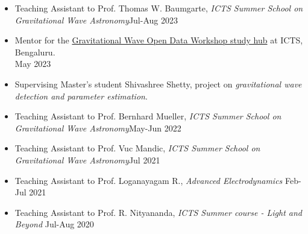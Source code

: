 \begin{itemize}[noitemsep]
\item Teaching Assistant to Prof. Thomas W. Baumgarte, \textit{ICTS Summer School on Gravitational Wave Astronomy}\hfill{Jul-Aug 2023}
\item Mentor for the \href{https://www.icts.res.in/discussion-meeting/gwodw2023}{Gravitational Wave Open Data Workshop study hub} at ICTS, Bengaluru.\\ \hfill{May 2023}
\item Supervising Master's student Shivashree Shetty, project on \textit{gravitational wave detection and parameter estimation}.
\item Teaching Assistant to Prof. Bernhard Mueller, \textit{ICTS Summer School on Gravitational Wave Astronomy}\hfill{May-Jun 2022}
\item Teaching Assistant to Prof. Vuc Mandic, \textit{ICTS Summer School on Gravitational Wave Astronomy}\hfill{Jul 2021}
\item Teaching Assistant to Prof. Loganayagam R., \textit{Advanced Electrodynamics} \hfill{Feb-Jul 2021}
\item Teaching Assistant to Prof. R. Nityananda, \textit{ICTS Summer course - Light and Beyond} \hfill{Jul-Aug 2020} 
\end{itemize}